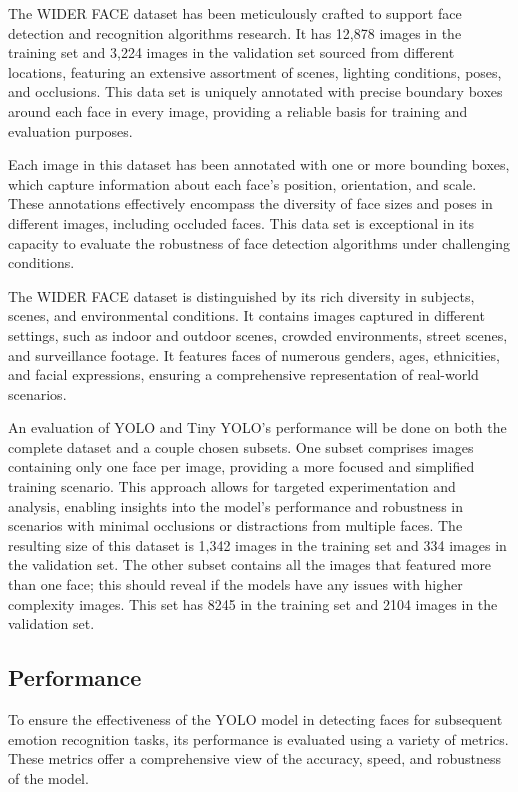 The WIDER FACE dataset has been meticulously crafted to support face detection and recognition algorithms research. It has 12,878 images in the training set and 3,224 images in the validation set sourced from different locations, featuring an extensive assortment of scenes, lighting conditions, poses, and occlusions. This data set is uniquely annotated with precise boundary boxes around each face in every image, providing a reliable basis for training and evaluation purposes.

Each image in this dataset has been annotated with one or more bounding boxes, which capture information about each face's position, orientation, and scale. These annotations effectively encompass the diversity of face sizes and poses in different images, including occluded faces. This data set is exceptional in its capacity to evaluate the robustness of face detection algorithms under challenging conditions.

The WIDER FACE dataset is distinguished by its rich diversity in subjects, scenes, and environmental conditions. It contains images captured in different settings, such as indoor and outdoor scenes, crowded environments, street scenes, and surveillance footage. It features faces of numerous genders, ages, ethnicities, and facial expressions, ensuring a comprehensive representation of real-world scenarios.

An evaluation of YOLO and Tiny YOLO's performance will be done on both the complete dataset and a couple chosen subsets. One subset comprises images containing only one face per image, providing a more focused and simplified training scenario. This approach allows for targeted experimentation and analysis, enabling insights into the model's performance and robustness in scenarios with minimal occlusions or distractions from multiple faces. The resulting size of this dataset is 1,342 images in the training set and 334 images in the validation set. The other subset contains all the images that featured more than one face; this should reveal if the models have any issues with higher complexity images. This set has 8245 in the training set and 2104 images in the validation set.

\subsection{Performance}

To ensure the effectiveness of the YOLO model in detecting faces for subsequent emotion recognition tasks, its performance is evaluated using a variety of metrics. These metrics offer a comprehensive view of the accuracy, speed, and robustness of the model.

